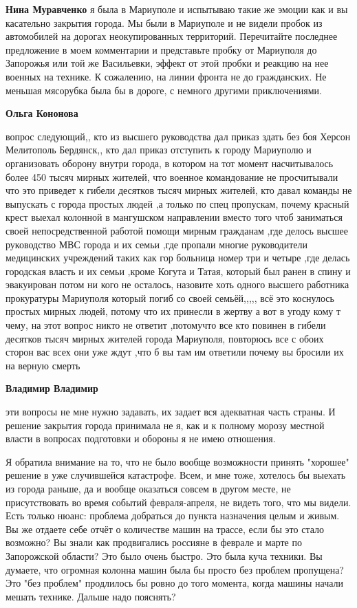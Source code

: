 \begin{itemize} %
\textbf{Нина Муравченко} я была в Мариуполе и испытываю такие же эмоции как и вы касательно закрытия города.
Мы были в Мариуполе и не видели пробок из автомобилей на дорогах неокупированных территорий. Перечитайте последнее предложение в моем комментарии и представьте пробку от Мариуполя до Запорожья или той же Васильевки, эффект от этой пробки и реакцию на нее военных на технике. К сожалению, на линии фронта не до гражданских. Не меньшая мясорубка была бы в дороге, с немного другими приключениями.

\textbf{Ольга Кононова} 

вопрос следующий,, кто из высшего руководства дал приказ здать без боя Херсон
Мелитополь Бердянск,, кто дал приказ отступить к городу Мариуполю и организовать
оборону внутри города, в котором на тот момент насчитывалось более 450 тысяч
мирных жителей, что военное командование не просчитывали что это приведет к
гибели десятков тысяч мирных жителей, кто давал команды не выпускать с города
простых людей ,а только по спец пропускам, почему красный крест выехал колонной
в мангушском направлении вместо того чтоб заниматься своей непосредственной
работой помощи мирным гражданам ,где делось высшее руководство МВС города и их
семьи ,где пропали многие руководители медицинских учреждений таких как гор
больница номер три и четыре ,где делась городская власть и их семьи ,кроме
Когута и Татая, который был ранен в спину и эвакуирован потом ни кого не
осталось, назовите хоть одного высшего работника прокуратуры Мариуполя который
погиб со своей семьёй,,,,, всё это коснулось простых мирных людей, потому что их
принесли в жертву а вот в угоду кому т чему, на этот вопрос никто не ответит
,потомучто все кто повинен в гибели десятков тысяч мирных жителей города
Мариуполя, повторюсь все с обоих сторон вас всех они уже ждут ,что б вы там им
ответили почему вы бросили их на верную смерть

\textbf{Владимир Владимир} 

эти вопросы не мне нужно задавать, их задает вся адекватная часть страны. И
решение закрытия города принимала не я, как и к полному морозу местной власти в
вопросах подготовки и обороны я не имею отношения.

Я обратила внимание на то, что не было вообще возможности принять "хорошее"
решение в уже случившейся катастрофе. Всем, и мне тоже, хотелось бы выехать из
города раньше, да и вообще оказаться совсем в другом месте, не присутствовать
во время событий февраля-апреля, не видеть того, что мы видели. Есть только
нюанс: проблема добраться до пункта назначения целым и живым. Вы же отдаете
себе отчёт о количестве машин на трассе, если бы это стало возможно? Вы знали
как продвигались россияне в феврале и марте по Запорожской области? Это было
очень быстро. Это была куча техники. Вы думаете, что огромная колонна машин
была бы просто без проблем пропущена? Это "без проблем" продлилось бы ровно до
того момента, когда машины начали мешать технике. Дальше надо пояснять?


\end{itemize}
